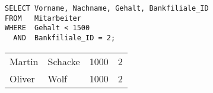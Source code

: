           \begin{lstlisting}[language=oracle_sql,caption={Der AND Operator},label=sql02_11]
SELECT Vorname, Nachname, Gehalt, Bankfiliale_ID
FROM   Mitarbeiter
WHERE  Gehalt < 1500
  AND  Bankfiliale_ID = 2;
          \end{lstlisting}
          \begin{center}
            \begin{small}
              \tablehead{}
              \begin{msoraclesql}
                \begin{supertabular}{llrr}
                  Martin & Schacke & 1000 & 2 \\
                  Oliver & Wolf & 1000 & 2 \\
                \end{supertabular}
              \end{msoraclesql}
            \end{small}
          \end{center}

